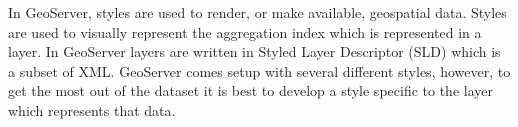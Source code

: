 %
%

In GeoServer, styles are used to render, or make available, geospatial data.
Styles are used to visually represent the aggregation index which is
represented in a layer. In GeoServer layers are written in Styled Layer
Descriptor (SLD) which is a subset of XML. GeoServer comes setup with
several different styles, however, to get the most out of the dataset it is
best to develop a style specific to the layer which represents that data.

